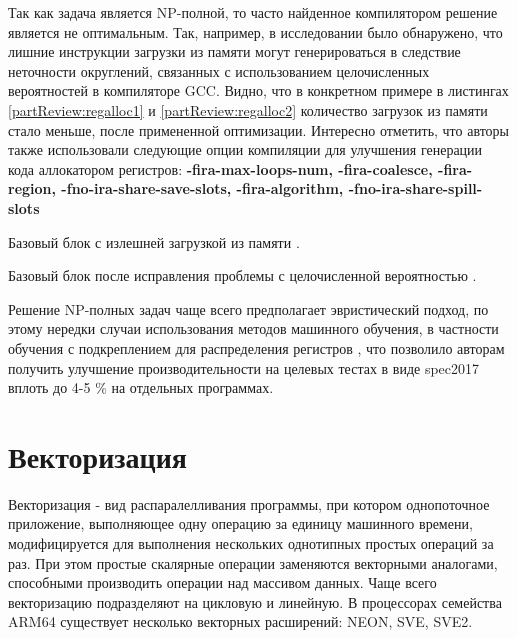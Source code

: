 Так как задача является NP-полной, то часто найденное компилятором решение является не оптимальным. Так, например, в исследовании  \cite{melnik2010case} было обнаружено, что лишние инструкции загрузки из памяти могут генерироваться в следствие неточности округлений, связанных с использованием целочисленных вероятностей в компиляторе GCC.  Видно, что в конкретном примере в листингах \ref{partReview:regalloc1} и  \ref{partReview:regalloc2} количество загрузок из памяти стало меньше, после примененной оптимизации. Интересно отметить, что авторы также использовали следующие опции компиляции для улучшения генерации кода аллокатором регистров: \textbf{-fira-max-loops-num, -fira-coalesce,  -fira-region, -fno-ira-share-save-slots, -fira-algorithm, -fno-ira-share-spill-slots }

\begin{ListingEnv}[!h]
	\captiondelim{ } 
	\caption{Базовый блок с излешней загрузкой из памяти \cite{melnik2010case}.}\label{partReview:regalloc1}
	
\end{ListingEnv}

\begin{ListingEnv}[!h]
	\captiondelim{ } 
	\caption{Базовый блок после исправления проблемы с целочисленной вероятностью \cite{melnik2010case}.}\label{partReview:regalloc2}
	
\end{ListingEnv}



Решение  NP-полных задач чаще всего предполагает эвристический подход, по этому нередки случаи использования методов машинного обучения, в частности обучения с подкреплением для распределения регистров \cite{venkatakeerthy2023rl4real}, что позволило авторам получить улучшение производительности на целевых тестах в виде spec2017 вплоть до 4-5 \% на отдельных программах.


\section{Векторизация} \label{pr:vectorization}
Векторизация - вид распаралелливания программы, при котором однопоточное приложение, выполняющее одну операцию за единицу машинного времени, модифицируется для выполнения нескольких однотипных простых операций за раз. При этом простые скалярные операции заменяются векторными аналогами, способными производить операции над массивом данных. Чаще всего векторизацию подразделяют на цикловую и линейную. \cite{pohl2018control} В процессорах семейства ARM64 существует несколько векторных расширений: NEON, SVE, SVE2. 

